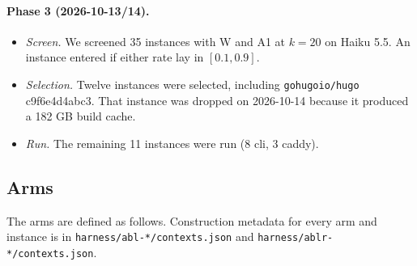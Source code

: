 \paragraph{Phase 3 (2026-10-13/14).}
\begin{itemize}
\item \emph{Screen.} We screened 35 instances with W and A1 at $k=20$ on Haiku 5.5. An instance entered if either rate lay in $[0.1, 0.9]$.
\item \emph{Selection.} Twelve instances were selected, including \texttt{gohugoio/hugo} c9f6e4d4abc3. That instance was dropped on 2026-10-14 because it produced a 182 GB build cache.
\item \emph{Run.} The remaining 11 instances were run (8 cli, 3 caddy).
\end{itemize}

\subsection{Arms}

The arms are defined as follows. Construction metadata for every arm and instance is in \texttt{harness/abl-*/contexts.json} and \texttt{harness/ablr-*/contexts.json}.

